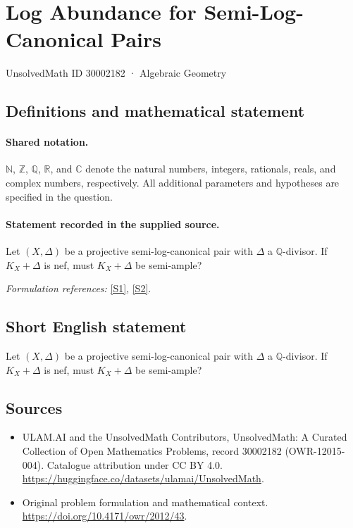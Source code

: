 \documentclass[11pt]{article}
\newcommand{\sref}[2]{\hyperlink{source:#1:#2}{[S#2]}}
\begin{document}
\setcounter{section}{30002181}
\section{Log Abundance for Semi-Log-Canonical Pairs}\label{30002182}
{\small UnsolvedMath ID 30002182 · Algebraic Geometry}
\subsection{Definitions and mathematical statement}

\paragraph{Shared notation.}$\mathbb N$, $\mathbb Z$, $\mathbb Q$, $\mathbb R$, and $\mathbb C$ denote the natural numbers, integers, rationals, reals, and complex numbers, respectively. All additional parameters and hypotheses are specified in the question.


\paragraph{Statement recorded in the supplied source.}
Let $(X,\Delta)$ be a projective semi-log-canonical pair with $\Delta$ a $\mathbb Q$-divisor. If $K_X+\Delta$ is nef, must $K_X+\Delta$ be semi-ample?
\par\smallskip\textit{Formulation references:} \sref{30002182}{1}, \sref{30002182}{2}.
\subsection{Short English statement}
Let $(X,\Delta)$ be a projective semi-log-canonical pair with $\Delta$ a $\mathbb Q$-divisor. If $K_X+\Delta$ is nef, must $K_X+\Delta$ be semi-ample?
\subsection{Sources}
\begin{itemize}
\item[\hypertarget{source:30002182:1}{S1}] ULAM.AI and the UnsolvedMath Contributors, UnsolvedMath: A Curated Collection of Open Mathematics Problems, record 30002182 (OWR-12015-004). Catalogue attribution under CC BY 4.0.
\url{https://huggingface.co/datasets/ulamai/UnsolvedMath}.
\item[\hypertarget{source:30002182:2}{S2}] Original problem formulation and mathematical context.
\url{https://doi.org/10.4171/owr/2012/43}.
\end{itemize}
\label{end:30002182}
\end{document}
